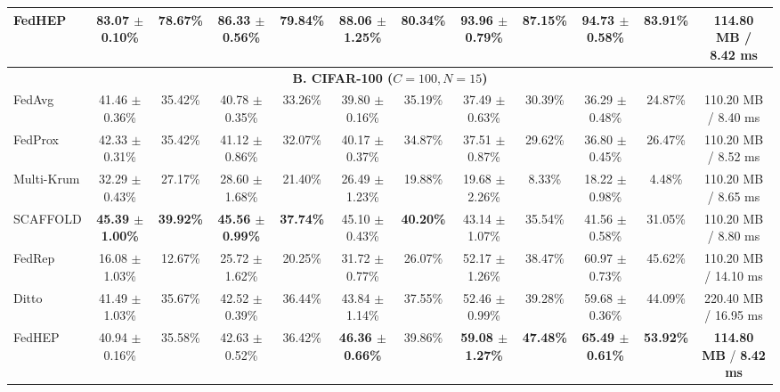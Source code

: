 \begin{table}[t]
{\begin{tabular}{lccccccccccc}
FedHEP & 83.07 $\pm$ 0.10\% & 78.67\% & 86.33 $\pm$ 0.56\% & 79.84\% & 88.06 $\pm$ 1.25\% & 80.34\% & 93.96 $\pm$ 0.79\% & 87.15\% & 94.73 $\pm$ 0.58\% & 83.91\% & \textbf{114.80 MB} / \textbf{8.42 ms} \\
\midrule
\multicolumn{12}{c}{\textbf{B. CIFAR-100 ($C=100, N=15$)}} \\
\midrule
FedAvg & 41.46 $\pm$ 0.36\% & 35.42\% & 40.78 $\pm$ 0.35\% & 33.26\% & 39.80 $\pm$ 0.16\% & 35.19\% & 37.49 $\pm$ 0.63\% & 30.39\% & 36.29 $\pm$ 0.48\% & 24.87\% & 110.20 MB / 8.40 ms \\
FedProx & 42.33 $\pm$ 0.31\% & 35.42\% & 41.12 $\pm$ 0.86\% & 32.07\% & 40.17 $\pm$ 0.37\% & 34.87\% & 37.51 $\pm$ 0.87\% & 29.62\% & 36.80 $\pm$ 0.45\% & 26.47\% & 110.20 MB / 8.52 ms \\
Multi-Krum & 32.29 $\pm$ 0.43\% & 27.17\% & 28.60 $\pm$ 1.68\% & 21.40\% & 26.49 $\pm$ 1.23\% & 19.88\% & 19.68 $\pm$ 2.26\% & 8.33\% & 18.22 $\pm$ 0.98\% & 4.48\% & 110.20 MB / 8.65 ms \\
SCAFFOLD & \textbf{45.39 $\pm$ 1.00\%} & \textbf{39.92\%} & \textbf{45.56 $\pm$ 0.99\%} & \textbf{37.74\%} & 45.10 $\pm$ 0.43\% & \textbf{40.20\%} & 43.14 $\pm$ 1.07\% & 35.54\% & 41.56 $\pm$ 0.58\% & 31.05\% & 110.20 MB / 8.80 ms \\
\thindashline
FedRep & 16.08 $\pm$ 1.03\% & 12.67\% & 25.72 $\pm$ 1.62\% & 20.25\% & 31.72 $\pm$ 0.77\% & 26.07\% & 52.17 $\pm$ 1.26\% & 38.47\% & 60.97 $\pm$ 0.73\% & 45.62\% & 110.20 MB / 14.10 ms \\
Ditto & 41.49 $\pm$ 1.03\% & 35.67\% & 42.52 $\pm$ 0.39\% & 36.44\% & 43.84 $\pm$ 1.14\% & 37.55\% & 52.46 $\pm$ 0.99\% & 39.28\% & 59.68 $\pm$ 0.36\% & 44.09\% & 220.40 MB / 16.95 ms \\
FedHEP & 40.94 $\pm$ 0.16\% & 35.58\% & 42.63 $\pm$ 0.52\% & 36.42\% & \textbf{46.36 $\pm$ 0.66\%} & 39.86\% & \textbf{59.08 $\pm$ 1.27\%} & \textbf{47.48\%} & \textbf{65.49 $\pm$ 0.61\%} & \textbf{53.92\%} & \textbf{114.80 MB} / \textbf{8.42 ms} \\
\bottomrule
\end{tabular}
}
\end{table}

